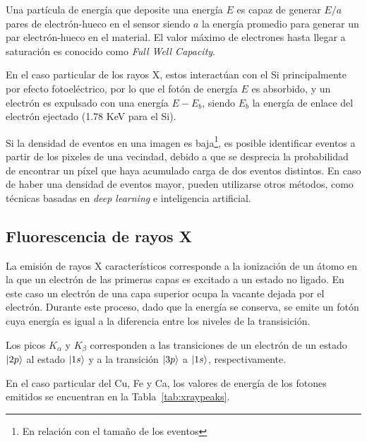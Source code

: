 \documentclass[twoside,twocolumn]{article}
\DeclarePairedDelimiter\ket{\lvert}{\rangle}
\begin{document}
      Una partícula de energía que deposite una energía $E$
      es capaz de generar $E / a$ pares de electrón-hueco en el sensor
      siendo $a$ la energía promedio para generar un par electrón-hueco en el material.
      El valor máximo de electrones hasta llegar a saturación es conocido como \emph{Full Well Capacity}.
      
      En el caso particular de los rayos X, estos interactúan con el Si principalmente por efecto fotoeléctrico,
      por lo que el fotón de energía $E$ es absorbido, y un electrón es expulsado con una energía $E-E_b$,
      siendo $E_b$ la energía de enlace del electrón ejectado (1.78 KeV para el Si)\cite{PerezCMOS}.

      Si la densidad de eventos en una imagen es baja\footnote{En relación con el tamaño de los eventos},
      es posible identificar eventos a partir de los pixeles de una vecindad,
      debido a que se desprecia la probabilidad de encontrar un píxel que haya acumulado carga de dos eventos distintos.
      En caso de haber una densidad de eventos mayor, pueden utilizarse otros métodos, como técnicas basadas en \emph{deep learning}
      e inteligencia artificial. \cite{ROE2005577} 
      
    \subsection{Fluorescencia de rayos X}\label{sec:intro:peaks}

      La emisión de rayos X característicos corresponde a la ionización de un átomo en la que un
      electrón de las primeras capas es excitado a un estado no ligado.
      En este caso un electrón de una capa superior ocupa la vacante dejada por el electrón.
      Durante este proceso, dado que la energía se conserva, se emite un fotón
      cuya energía es igual a la diferencia entre los niveles de la transisición.

      Los picos $K_\alpha$ y $K_\beta$ corresponden a las transiciones de un electrón de un estado
      $\ket{2p}$ al estado $\ket{1s}$ y a la transición $\ket{3p}$ a $\ket{1s}$, respectivamente.
      
      En el caso particular del Cu, Fe y Ca, los valores de energía de los fotones emitidos se encuentran
      en la Tabla~\ref{tab:xraypeaks}.
\end{document}
